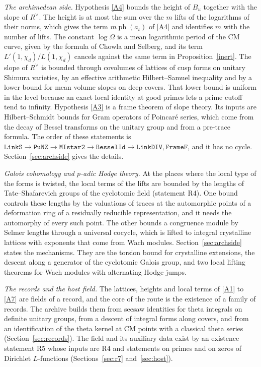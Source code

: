 \documentclass[11pt,letterpaper]{article}
\numberwithin{equation}{section}
\begin{document}
\emph{The archimedean side.} Hypothesis \eqref{A4} bounds the height of $B_u$ together with the slope of $R^\vee$. The height is at most the sum over the $m$ lifts of the logarithms of their norms, which gives the term $m\operatorname{ph}(a_t)$ of \eqref{A4} and identifies $m$ with the number of lifts. The constant $\log\Omega$ is a mean logarithmic period of the CM curve, given by the formula of Chowla and Selberg, and its term $L'(1,\chi_d)/L(1,\chi_d)$ cancels against the same term in Proposition~\ref{inert}. The slope of $R^\vee$ is bounded through covolumes of lattices of cusp forms on unitary Shimura varieties, by an effective arithmetic Hilbert--Samuel inequality and by a lower bound for mean volume slopes on deep covers. That lower bound is uniform in the level because an exact local identity at good primes lets a prime cutoff tend to infinity. Hypothesis \eqref{A3} is a frame theorem of slope theory. Its inputs are Hilbert--Schmidt bounds for Gram operators of Poincar\'e series, which come from the decay of Bessel transforms on the unitary group and from a pre-trace formula. The order of these statements is $\texttt{LinkS}\to\texttt{PuNZ}\to\texttt{MIstar2}\to\texttt{BesselId}\to\texttt{LinkDIV},\texttt{FrameF}$, and it has no cycle. Section~\ref{sec:archside} gives the details.

\emph{Galois cohomology and $p$-adic Hodge theory.} At the places where the local type of the forms is twisted, the local terms of the lifts are bounded by the lengths of Tate--Shafarevich groups of the cyclotomic field (statement R4). One bound controls these lengths by the valuations of traces at the automorphic points of a deformation ring of a residually reducible representation, and it needs the automorphy of every such point. The other bounds a congruence module by Selmer lengths through a universal cocycle, which is lifted to integral crystalline lattices with exponents that come from Wach modules. Section~\ref{sec:archside} states the mechanisms. They are the torsion bound for crystalline extensions, the descent along a generator of the cyclotomic Galois group, and two local lifting theorems for Wach modules with alternating Hodge jumps.

\emph{The records and the host field.} The lattices, heights and local terms of \eqref{A1} to \eqref{A7} are fields of a record, and the core of the route is the existence of a family of records. The archive builds them from seesaw identities for theta integrals on definite unitary groups, from a descent of integral forms along covers, and from an identification of the theta kernel at CM points with a classical theta series (Section~\ref{sec:records}). The field and its auxiliary data exist by an existence statement R5 whose inputs are R4 and statements on primes and on zeros of Dirichlet $L$-functions (Sections~\ref{sec:r7} and~\ref{sec:host}).
\end{document}
